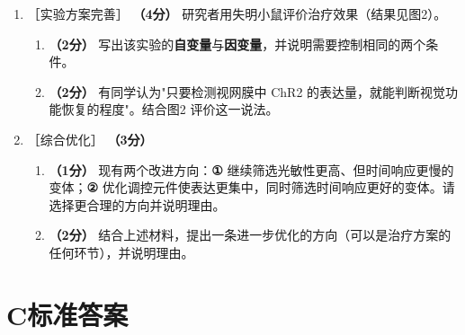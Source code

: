 \documentclass[UTF8,a4paper,11pt]{ctexart}
\newcommand{\pt}[1]{\textbf{（#1分）}}
\newcommand{\tg}[1]{{\small\color{deepgreen}［#1］}}
\begin{document}
\begin{enumerate}[leftmargin=2.1em,itemsep=5pt]
\item \tg{实验方案完善} \pt{4} 研究者用失明小鼠评价治疗效果（结果见图2）。
\begin{enumerate}[label=(\arabic*),leftmargin=1.4em,itemsep=2pt]
\item \pt{2} 写出该实验的\textbf{自变量}与\textbf{因变量}，并说明需要控制相同的两个条件。
\item \pt{2} 有同学认为"只要检测视网膜中 ChR2 的表达量，就能判断视觉功能恢复的程度"。结合图2 评价这一说法。
\end{enumerate}

\item \tg{综合优化} \pt{3}
\begin{enumerate}[label=(\arabic*),leftmargin=1.4em,itemsep=2pt]
\item \pt{1} 现有两个改进方向：\textbf{①} 继续筛选光敏性更高、但时间响应更慢的变体；\textbf{②} 优化调控元件使表达更集中，同时筛选时间响应更好的变体。请选择更合理的方向并说明理由。
\item \pt{2} 结合上述材料，提出一条进一步优化的方向（可以是治疗方案的任何环节），并说明理由。
\end{enumerate}
\end{enumerate}

\section{C\quad 标准答案}
\end{document}
